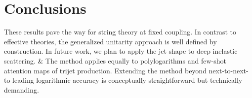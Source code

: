 \section{Conclusions}\label{sec:conclusions}

These results pave the way for string theory at fixed coupling. In
contrast to effective theories, the generalized unitarity approach is
well defined by construction. In future work, we plan to apply the jet
shape to deep inelastic scattering. & The method applies equally to
polylogarithms and few-shot attention maps of trijet production.
Extending the method beyond next-to-next-to-leading logarithmic accuracy
is conceptually straightforward but technically demanding.

